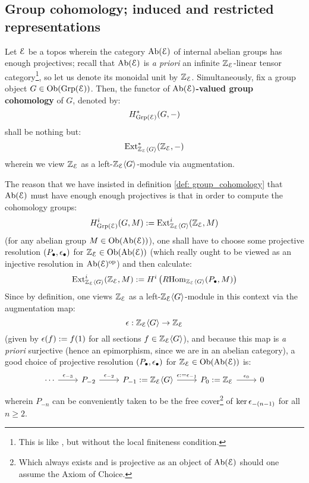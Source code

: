         \subsection{Group cohomology; induced and restricted representations}
            \begin{definition} \label{def: group_cohomology}
                Let $\mathcal{E}$ be a topos wherein the category $\mathrm{Ab}(\mathcal{E})$ of internal abelian groups has enough projectives; recall that $\mathrm{Ab}(\mathcal{E})$ is \textit{a priori} an infinite $\mathbb{Z}_{\mathcal{E}}$-linear tensor category\footnote{This is like \cite[Definition 4.1.1]{EGNO}, but without the local finiteness condition.}, so let us denote its monoidal unit by $\mathbb{Z}_{\mathcal{E}}$. Simultaneously, fix a group object $G \in \mathrm{Ob}(\mathrm{Grp}(\mathcal{E}))$. Then, the functor of \textbf{$\mathrm{Ab}(\mathcal{E})$-valued group cohomology} of $G$, denoted by:
                    $$H^*_{\mathrm{Grp}(\mathcal{E})}(G, -)$$
                shall be nothing but:
                    $$\mathrm{Ext}^*_{\mathbb{Z}_{\mathcal{E}}\langle G\rangle}(\mathbb{Z}_{\mathcal{E}}, -)$$
                wherein we view $\mathbb{Z}_{\mathcal{E}}$ as a left-$\mathbb{Z}_{\mathcal{E}}\langle G\rangle$-module via augmentation.
            \end{definition}
            \begin{remark}
                The reason that we have insisted in definition \ref{def: group_cohomology} that $\mathrm{Ab}(\mathcal{E})$ must have enough enough projectives is that in order to compute the cohomology groups:
                    $$H^i_{\mathrm{Grp}(\mathcal{E})}(G, M) := \mathrm{Ext}^i_{\mathbb{Z}_{\mathcal{E}}\langle G\rangle}(\mathbb{Z}_{\mathcal{E}}, M)$$
                (for any abelian group $M \in \mathrm{Ob}(\mathrm{Ab}(\mathcal{E}))$), one shall have to choose some projective resolution $(P_{\bullet}, \epsilon_{\bullet})$ for $\mathbb{Z}_{\mathcal{E}} \in \mathrm{Ob}(\mathrm{Ab}(\mathcal{E}))$ (which really ought to be viewed as an injective resolution in $\mathrm{Ab}(\mathcal{E})^{\mathrm{op}}$) and then calculate:
                    $$\mathrm{Ext}^i_{\mathbb{Z}_{\mathcal{E}}\langle G\rangle}(\mathbb{Z}_{\mathcal{E}}, M) := H^i\left( R\mathrm{Hom}_{\mathbb{Z}_{\mathcal{E}}\langle G\rangle}(P_{\bullet}, M) \right)$$
                Since by definition, one views $\mathbb{Z}_{\mathcal{E}}$ as a left-$\mathbb{Z}_{\mathcal{E}}\langle G\rangle$-module in this context via the augmentation map:
                    $$\epsilon: \mathbb{Z}_{\mathcal{E}}\langle G\rangle \to \mathbb{Z}_{\mathcal{E}}$$
                (given by $\epsilon(f) := f(1)$ for all sections $f \in \mathbb{Z}_{\mathcal{E}}\langle G\rangle$), and because this map is \textit{a priori} surjective (hence an epimorphism, since we are in an abelian category), a good choice of projective resolution $(P_{\bullet}, \epsilon_{\bullet})$ for $\mathbb{Z}_{\mathcal{E}} \in \mathrm{Ob}(\mathrm{Ab}(\mathcal{E}))$ is:
                    $$
                        \begin{tikzcd}
                        	\cdots & {P_{-2}} & {P_{-1} := \Z_{\E}\<G\>} & {P_0 := \Z_{\E}} & 0
                        	\arrow["{\e_0}", from=1-4, to=1-5]
                        	\arrow["{\e := \e_{-1}}", from=1-3, to=1-4]
                        	\arrow["{\e_{-2}}", from=1-2, to=1-3]
                        	\arrow["{\e_{-3}}", from=1-1, to=1-2]
                        \end{tikzcd}
                    $$
                wherein $P_{-n}$ can be conveniently taken to be the free cover\footnote{Which always exists and is projective as an object of $\mathrm{Ab}(\mathcal{E})$ should one assume the Axiom of Choice.} of $\ker \epsilon_{-(n - 1)}$ for all $n \geq 2$.
            \end{remark}
